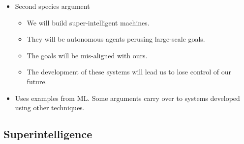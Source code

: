 \begin{itemize}
    \item Second species argument
    \begin{itemize}
        \item We will build super-intelligent machines.
        \item They will be autonomous agents perusing large-scale goals.
        \item The goals will be mis-aligned with ours.
        \item The development of these systems will lead us to lose control of our future.
    \end{itemize}
    \item Uses examples from ML. Some arguments carry over to systems developed using other techniques.
\end{itemize}


\subsection{Superintelligence}

